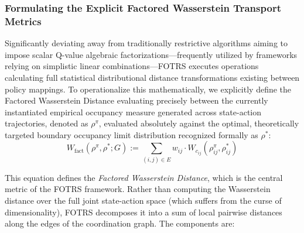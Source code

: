 \documentclass[12pt,a4paper,oneside]{report}
\theoremstyle{definition}
\theoremstyle{remark}
\begin{document}
\subsubsection{Formulating the Explicit Factored Wasserstein Transport Metrics}
Significantly deviating away from traditionally restrictive algorithms aiming to impose scalar Q-value algebraic factorizations---frequently utilized by frameworks relying on simplistic linear combinations---FOTRS executes operations calculating full statistical distributional distance transformations existing between policy mappings. To operationalize this mathematically, we explicitly define the Factored Wasserstein Distance evaluating precisely between the currently instantiated empirical occupancy measure generated across state-action trajectories, denoted as $\rho^\pi$, evaluated absolutely against the optimal, theoretically targeted boundary occupancy limit distribution recognized formally as $\rho^*$:
\begin{equation} \label{eq:factored_wasserstein}
W_{\text{fact}}(\rho^\pi, \rho^*; G) := \sum_{(i,j) \in E} w_{ij} \cdot W_{c_{ij}}(\rho^\pi_{ij}, \rho^*_{ij})
\end{equation}

\medskip
\noindent This equation defines the \emph{Factored Wasserstein Distance}, which is the central metric of the FOTRS framework. Rather than computing the Wasserstein distance over the full joint state-action space (which suffers from the curse of dimensionality), FOTRS decomposes it into a sum of local pairwise distances along the edges of the coordination graph. The components are:
\end{document}
